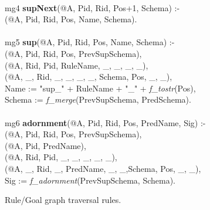 {\begin{figure}
\begin{boxedminipage}{\linewidth}
\\
mg4 {\bf supNext}(@A, Pid, Rid, Pos+1, Schema) :- \\
(@A, Pid, Rid, Pos, Name, Schema). \\
\\
mg5 {\bf sup}(@A, Pid, Rid, Pos, Name, Schema) :- \\
(@A, Pid, Rid, Pos, PrevSupSchema),\\
(@A, Rid, Pid, RuleName, \_, \_, \_, \_),\\
(@A, \_, Rid, \_, \_, \_, \_, Schema, Pos, \_, \_),\\
\datalogspace Name := "sup\_" + RuleName + "\_" + {\em f\_tostr}(Pos),\\
\datalogspace Schema := {\em f\_merge}(PrevSupSchema, PredSchema).\\
\\
mg6 {\bf adornment}(@A, Pid, Rid, Pos, PredName, Sig) :- \\
(@A, Pid, Rid, Pos, PrevSupSchema),\\
(@A, Pid, PredName), \\
(@A, Rid, Pid, \_, \_, \_, \_, \_),\\
(@A, \_, Rid, \_, PredName, \_, \_,Schema, Pos, \_, \_),\\ 
\datalogspace Sig := {\em f\_adornment}(PrevSupSchema, Schema).
\end{boxedminipage}
\caption{\label{ch:evita:fig:magicRules}Rule/Goal graph traversal rules.}
\end{figure}

}
